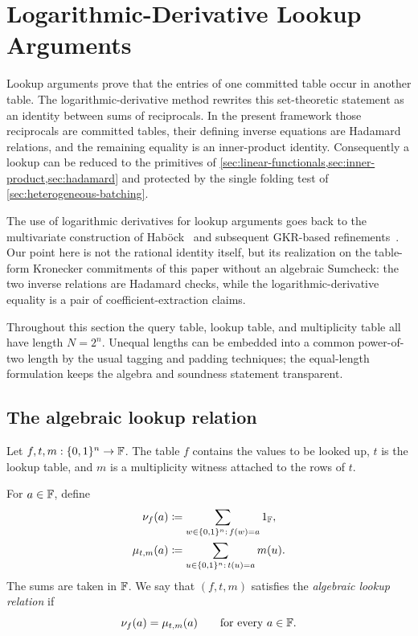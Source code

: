 \section{Logarithmic-Derivative Lookup Arguments}
\label{sec:lookup}

Lookup arguments prove that the entries of one committed table occur in another table.  The logarithmic-derivative method rewrites this set-theoretic statement as an identity between sums of reciprocals.  In the present framework those reciprocals are committed tables, their defining inverse equations are Hadamard relations, and the remaining equality is an inner-product identity.  Consequently a lookup can be reduced to the primitives of \cref{sec:linear-functionals,sec:inner-product,sec:hadamard} and protected by the single folding test of \cref{sec:heterogeneous-batching}.

The use of logarithmic derivatives for lookup arguments goes back to the multivariate construction of Hab\"ock~\cite{Habock23} and subsequent GKR-based refinements~\cite{PapiniHabock23}.  Our point here is not the rational identity itself, but its realization on the table-form Kronecker commitments of this paper without an algebraic Sumcheck: the two inverse relations are Hadamard checks, while the logarithmic-derivative equality is a pair of coefficient-extraction claims.

Throughout this section the query table, lookup table, and multiplicity table all have length $N=2^n$.  Unequal lengths can be embedded into a common power-of-two length by the usual tagging and padding techniques; the equal-length formulation keeps the algebra and soundness statement transparent.

\subsection{The algebraic lookup relation}
\label{sec:lookup-relation}

Let $f,t,m:\{0,1\}^n\to\mathbb{F}$.  The table $f$ contains the values to be looked up, $t$ is the lookup table, and $m$ is a multiplicity witness attached to the rows of $t$.

\begin{definition}
\label{def:lookup-residue-multiplicities}
For $a\in\mathbb{F}$, define
\begin{align}
  \nu_f(a)
  &\coloneqq
  \sum_{w\in\{0,1\}^n:\,f(w)=a}1_{\mathbb{F}},
  \label{eq:lookup-query-multiplicity}\\
  \mu_{t,m}(a)
  &\coloneqq
  \sum_{u\in\{0,1\}^n:\,t(u)=a}m(u).
  \label{eq:lookup-table-multiplicity}
\end{align}
The sums are taken in $\mathbb{F}$.  We say that $(f,t,m)$ satisfies the \emph{algebraic lookup relation} if
\begin{equation}
  \nu_f(a)=\mu_{t,m}(a)
  \qquad\text{for every }a\in\mathbb{F}.
  \label{eq:algebraic-lookup-relation}
\end{equation}
\end{definition}

